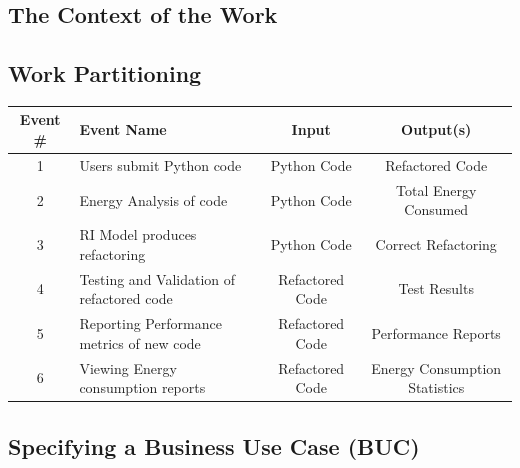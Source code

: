 \documentclass[12pt]{article}
\begin{document}
\subsection{The Context of the Work}


\subsection{Work Partitioning}

\begin{tabular}{ |c|p{2.5cm}|c|c| }
  \hline
  Event \# & Event Name & Input & Output(s) \\
  \hline\hline

  1 & Users submit Python code & Python Code & Refactored Code \\
  2 & Energy Analysis of code & Python Code & Total Energy Consumed \\
  3 & RI Model produces refactoring & Python Code & Correct Refactoring \\
  4 & Testing and Validation of refactored code & Refactored Code & Test Results \\
  5 & Reporting Performance metrics of new code & Refactored Code & Performance Reports \\
  6 & Viewing Energy consumption reports & Refactored Code & Energy Consumption Statistics \\

  \hline
\end{tabular}

\subsection{Specifying a Business Use Case (BUC)}
\end{document}

